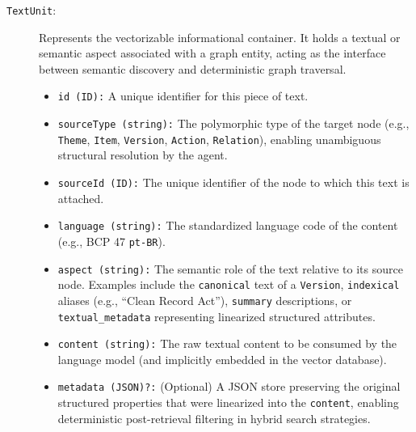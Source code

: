 \documentclass[11pt]{article}
\begin{document}
\begin{description}
    \item[\texttt{TextUnit}:] Represents the vectorizable informational container. It holds a textual or semantic aspect associated with a graph entity, acting as the interface between semantic discovery and deterministic graph traversal.
    \begin{itemize}
        \item \texttt{id (ID):} A unique identifier for this piece of text.
        \item \texttt{sourceType (string):} The polymorphic type of the target node (e.g., \texttt{Theme}, \texttt{Item}, \texttt{Version}, \texttt{Action}, \texttt{Relation}), enabling unambiguous structural resolution by the agent.
        \item \texttt{sourceId (ID):} The unique identifier of the node to which this text is attached.
        \item \texttt{language (string):} The standardized language code of the content (e.g., BCP 47 \texttt{pt-BR}).
        \item \texttt{aspect (string):} The semantic role of the text relative to its source node. Examples include the \texttt{canonical} text of a \texttt{Version}, \texttt{indexical} aliases (e.g., ``Clean Record Act''), \texttt{summary} descriptions, or \texttt{textual\_metadata} representing linearized structured attributes.
        \item \texttt{content (string):} The raw textual content to be consumed by the language model (and implicitly embedded in the vector database).
        \item \texttt{metadata (JSON)?:} (Optional) A JSON store preserving the original structured properties that were linearized into the \texttt{content}, enabling deterministic post-retrieval filtering in hybrid search strategies.
    \end{itemize}
    

\end{description}
\end{document}
